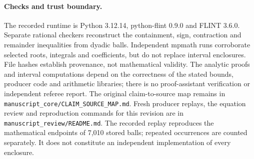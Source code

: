 \documentclass[11pt,a4paper]{article}
\numberwithin{equation}{section}
\theoremstyle{remark}\newtheorem{remark}[theorem]{Remark}
\begin{document}
\paragraph{Checks and trust boundary.}
The recorded runtime is Python 3.12.14, python-flint 0.9.0 and FLINT 3.6.0.
Separate rational checkers reconstruct the containment, sign, contraction
and remainder inequalities from dyadic balls. Independent mpmath runs
corroborate selected roots, integrals and coefficients, but do not replace
interval enclosures. File hashes establish provenance, not mathematical
validity. The analytic proofs and interval computations depend on the
correctness of the stated bounds, producer code and arithmetic libraries;
there is no proof-assistant verification or independent referee report.
The original claim-to-source map remains in
\texttt{manuscript\_core/CLAIM\_SOURCE\_MAP.md}. Fresh producer replays,
the equation review and reproduction commands for this revision are in
\texttt{manuscript\_review/README.md}. The recorded replay reproduces
the mathematical endpoints of 7,010 stored balls; repeated occurrences
are counted separately. It does not constitute an independent
implementation of every enclosure.
\end{document}
